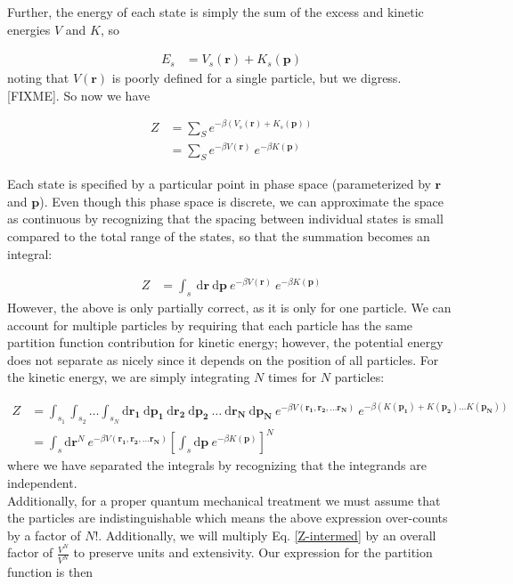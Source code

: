 \documentclass[12pt]{article}
\newcommand*{\diff}{\mathrm{d}}
\begin{document}
Further, the energy of each state is simply the sum of the excess and kinetic energies $V$ and $K$, so

\begin{align}
    E_s &= V_s(\mathbf{r}) + K_s(\mathbf{p})
\end{align}
noting that $V(\mathbf{r})$ is poorly defined for a single particle, but we digress. [FIXME]. 
So now we have 

\begin{align}
    Z &= \sum_S e^{-\beta (V_s(\mathbf{r}) + K_s(\mathbf{p}))}\\
    &= \sum_S e^{-\beta V(\mathbf{r})}~e^{-\beta K(\mathbf{p})}
\end{align} 

Each state is specified by a particular point in phase space (parameterized by $\mathbf{r}$ and $\mathbf{p}$). Even though this phase space is discrete, we can approximate the space as continuous by recognizing that the {\color{red}spacing between individual states is small compared to the total range of the states}, so that the summation becomes an integral:

\begin{align}
    Z &= \int_s~ \diff\mathbf{r}~ \diff\mathbf{p} ~e^{-\beta V(\mathbf{r})}~e^{-\beta K(\mathbf{p})}
\end{align} 
However, the above is only partially correct, as it is only for one particle. We can account for multiple particles by requiring that each particle has the same partition function contribution for kinetic energy; however, the potential energy does not separate as nicely since it depends on the position of all particles. For the kinetic energy, we are simply integrating $N$ times for $N$ particles:

\begin{align}
    Z &= \int_{s_1} \int_{s_2} \dots \int_{s_N} \diff\mathbf{r_1}~ \diff\mathbf{p_1} ~\diff\mathbf{r_2} ~\diff\mathbf{p_2} ~\dots ~\diff\mathbf{r_N}~ \diff\mathbf{p_N} ~e^{-\beta V(\mathbf{r_1}, \mathbf{r_2}, \dots \mathbf{r_N})}~e^{-\beta(K(\mathbf{p_1}) + K(\mathbf{p_2}) ... K(\mathbf{p_N}))}\\
    &= \int_s \diff\mathbf{r}^N ~e^{-\beta V(\mathbf{r_1}, \mathbf{r_2}, \dots \mathbf{r_N})} \left[\int_s \diff\mathbf{p}~e^{-\beta K(\mathbf{p})}\right]^{N}
    \label{Z-intermed}
\end{align}
where we have separated the integrals by recognizing that the integrands are independent.\\
Additionally, for a proper quantum mechanical treatment we must assume that the particles are indistinguishable which means the above expression over-counts by a factor of $N!$. Additionally, we will multiply Eq. \ref{Z-intermed} by an overall factor of $\frac{V^N}{V^N}$ to preserve units and extensivity. Our expression for the partition function is then 
\end{document}
